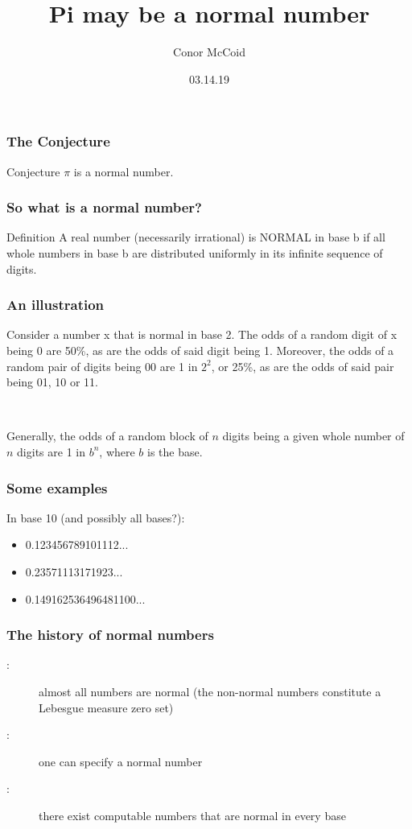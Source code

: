 \documentclass{beamer}
\title{Pi may be a normal number}
\author{Conor McCoid}
\institute{University of Geneva}
\date{03.14.19}
\begin{document}
\frame{\titlepage}

\begin{frame}
\frametitle{The Conjecture}
\begin{block}{Conjecture}
$\pi$ is a normal number.
\end{block}
\end{frame}

\begin{frame}
\frametitle{So what is a normal number?}
\begin{block}{Definition}
A real number (necessarily irrational) is NORMAL in base b if all whole numbers in base b are distributed uniformly in its infinite sequence of digits.
\end{block}
\end{frame}

\begin{frame}
\frametitle{An illustration}
Consider a number x that is normal in base 2.
The odds of a random digit of x being 0 are 50\%, as are the odds of said digit being 1.
Moreover, the odds of a random pair of digits being 00 are 1 in $2^2$, or 25\%, as are the odds of said pair being 01, 10 or 11.

~

Generally, the odds of a random block of $n$ digits being a given whole number of $n$ digits are 1 in $b^n$, where $b$ is the base.
\end{frame}

\begin{frame}
\frametitle{Some examples}
In base 10 (and possibly all bases?):
\begin{itemize}
\item 0.123456789101112...
\item 0.23571113171923...
\item 0.149162536496481100...
\end{itemize}
\end{frame}

\begin{frame}
\frametitle{The history of normal numbers}
\begin{description}
\item[\cite{borel1909probabilites}:] almost all numbers are normal (the non-normal numbers constitute a Lebesgue measure zero set)
\item[\cite{sierpinski1917demonstration}:] one can specify a normal number
\item[\cite{becher2002example}:] there exist computable numbers that are normal in every base
\end{description}
\end{frame}
\end{document}
